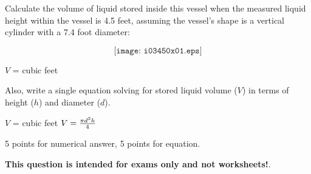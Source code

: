 

Calculate the volume of liquid stored inside this vessel when the measured liquid height within the vessel is 4.5 feet, assuming the vessel's shape is a vertical cylinder with a 7.4 foot diameter:

$$\texttt{[image: i03450x01.eps]}$$

$V$ = \underbar{\hskip 50pt} cubic feet

\vskip 10pt

Also, write a single equation solving for stored liquid volume ($V$) in terms of height ($h$) and diameter ($d$). 







$V$ =  cubic feet \hskip 30pt $V = {{\pi d^2 h} \over 4}$

\vskip 10pt

5 points for numerical answer, 5 points for equation.







{\bf This question is intended for exams only and not worksheets!}.



